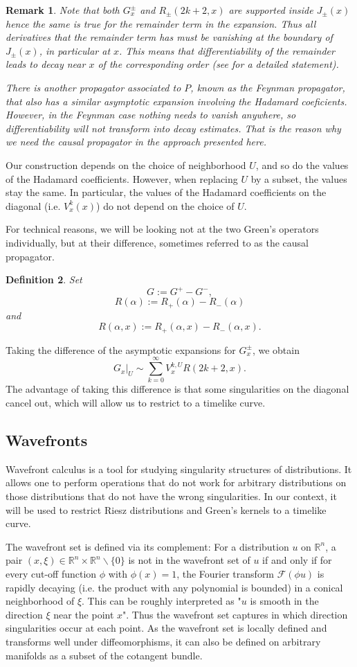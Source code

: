 \documentclass[11pt]{article}
\def\R{{\mathbb{R}}}
\def\insum#1{\sum\limits_{#1=0}^\infty}
\def\O {\backslash \{0\}}
\def\F {\mathcal{F}}
\newtheorem{df}{Definition}[section]
\newtheorem{rem}[df]{Remark}
\begin{document}
\begin{rem}
	Note that both $G^\pm_x$ and $R_\pm(2k+2,x)$ are supported inside $J_\pm(x)$ hence the same is true for the remainder term in the expansion. Thus all derivatives that the remainder term has must be vanishing at the boundary of $J_\pm(x)$, in particular at $x$. This means that differentiability of the remainder leads to decay near $x$ of the corresponding order (see \cite[Theorem 2.5.2]{BGP} for a detailed statement).
	
	There is another propagator associated to $P$, known as the Feynman propagator, that also has a similar asymptotic expansion involving the Hadamard coeficients. However, in the Feynman case nothing needs to vanish anywhere, so differentiability will not transform into decay estimates. That is the reason why we need the causal propagator in the approach presented here.
\end{rem}

Our construction depends on the choice of neighborhood $U$, and so do the values of the Hadamard coefficients. However, when replacing $U$ by a subset, the values stay the same. In particular, the values of the Hadamard coefficients on the diagonal (i.e. $V^k_x(x)$) do not depend on the choice of $U$.

For technical reasons, we will be looking not at the two Green's operators individually, but at their difference, sometimes referred to as the causal propagator.
\begin{df}
	\label{dfcp}
	Set
	\[G:=G^+-G^-,\]
	\[R(\alpha):=R_+(\alpha)-R_-(\alpha)\]
	and
	\[R(\alpha,x):=R_+(\alpha,x)-R_-(\alpha,x).\]
\end{df}
Taking the difference of the asymptotic expansions for $G^\pm_x$, we obtain
\[G_{x}|_U\sim\insum{k}V^{k,U}_xR(2k+2,x).\]
The advantage of taking this difference is that some singularities on the diagonal cancel out, which will allow us to restrict to a timelike curve.
\subsection{Wavefronts}
Wavefront calculus is a tool for studying singularity structures of distributions. It allows one to perform operations that do not work for arbitrary distributions on those distributions that do not have the wrong singularities. In our context, it will be used to restrict Riesz distributions and Green's kernels to a timelike curve.

The wavefront set is defined via its complement: For a distribution $u$ on $\R^n$, a pair $(x,\xi)\in\R^n\times \R^n\O$ is not in the wavefront set of $u$ if and only if for every cut-off function $\phi$ with $\phi(x)=1$, the Fourier transform $\F(\phi u)$ is rapidly decaying (i.e. the product with any polynomial is bounded) in a conical neighborhood of $\xi$. This can be roughly interpreted as "$u$ is smooth in the direction $\xi$ near the point $x$". Thus the wavefront set captures in which direction singularities occur at each point. As the wavefront set is locally defined and transforms well under diffeomorphisms, it can also be defined on arbitrary manifolds as a subset of the cotangent bundle.
\end{document}
